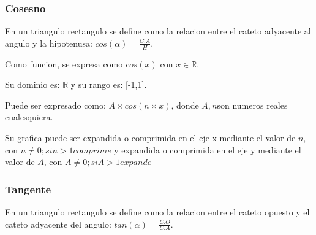 \subsubsection{Cosesno} \label{Cos}
En un triangulo rectangulo se define como la relacion entre el cateto adyacente al
angulo y la hipotenusa: $ cos(\alpha)= \frac{C.A}{H} $.

Como funcion, se expresa como $ cos(x) \text{ con  }x\in\mathbb{R} $.

Su dominio es: $ \mathbb{R} $ y su rango es: [-1,1].

Puede ser expresado como: $ A\times cos(n\times x) $, donde $A,n$son numeros reales
cualesquiera.

Su grafica puede ser expandida o comprimida en el eje x mediante el valor de $n$,
con $ n \not = 0; si n>1 comprime $  y  expandida o comprimida en el eje y
mediante el valor de $ A $, con $ A \not = 0; si A>1 expande $




\begin{center}
\end{center}




\subsubsection{Tangente} \label{Tan}
En un triangulo rectangulo se define como la relacion entre el cateto opuesto y
el cateto adyacente del angulo: $ tan(\alpha)= \frac{C.O}{C.A} $.

